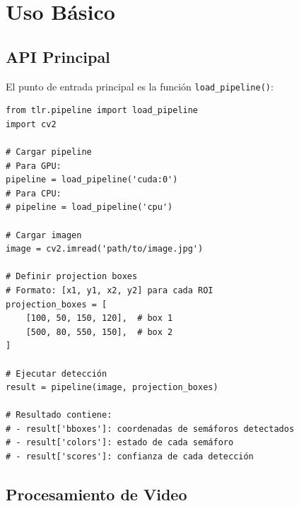 \section{Uso Básico}

\subsection{API Principal}

El punto de entrada principal es la función \texttt{load\_pipeline()}:

\begin{codesnippet}
\begin{verbatim}
from tlr.pipeline import load_pipeline
import cv2

# Cargar pipeline
# Para GPU:
pipeline = load_pipeline('cuda:0')
# Para CPU:
# pipeline = load_pipeline('cpu')

# Cargar imagen
image = cv2.imread('path/to/image.jpg')

# Definir projection boxes
# Formato: [x1, y1, x2, y2] para cada ROI
projection_boxes = [
    [100, 50, 150, 120],  # box 1
    [500, 80, 550, 150],  # box 2
]

# Ejecutar detección
result = pipeline(image, projection_boxes)

# Resultado contiene:
# - result['bboxes']: coordenadas de semáforos detectados
# - result['colors']: estado de cada semáforo
# - result['scores']: confianza de cada detección
\end{verbatim}
\end{codesnippet}

\subsection{Procesamiento de Video}

